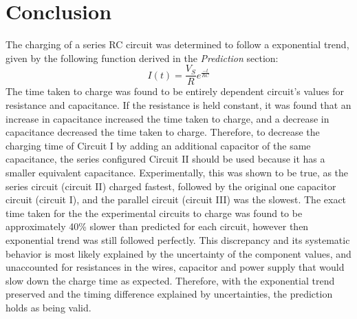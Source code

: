 \documentclass[12pt,letterpaper]{article}
\begin{document}
\section*{Conclusion}
The charging of a series RC circuit was determined to follow a exponential trend, given by the following function derived in the \textit{Prediction} section:
\begin{equation}
I(t) = \frac{V_S}{R}e^{\frac{-t}{RC}}
\end{equation}
The time taken to charge was found to be entirely dependent circuit's values for resistance and capacitance. If the resistance is held constant, it was found that an increase in capacitance increased the time taken to charge, and a decrease in capacitance decreased the time taken to charge. Therefore, to decrease the charging time of Circuit I by adding an additional capacitor of the same capacitance, the series configured Circuit II should be used because it has a smaller equivalent capacitance. Experimentally, this was shown to be true, as the series circuit (circuit II) charged fastest, followed by the original one capacitor circuit (circuit I), and the parallel circuit (circuit III) was the slowest.  The exact time taken for the the experimental circuits to charge was found to be approximately 40\% slower than predicted for each circuit, however then exponential trend was still followed perfectly. This discrepancy and its systematic behavior is most likely explained by the uncertainty of the component values, and unaccounted for resistances in the wires, capacitor and power supply that would slow down the charge time as expected. Therefore, with the exponential trend preserved and the timing difference explained by uncertainties, the prediction holds as being valid.
\end{document}
